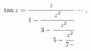 \[\mathop{\tan\/}\nolimits z=\cfrac{z}{1-\cfrac{z^{2}}{3-\cfrac{z^{2}}{5-\cfrac{%
z^{2}}{7-}}}}\cdots,\]